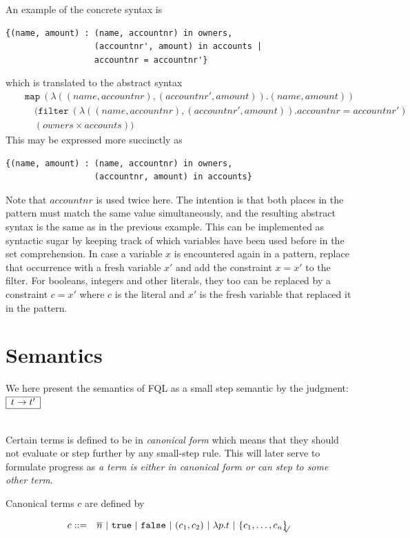 \documentclass[a4paper]{article}
\newcommand{\buzz}[1]{{\sl #1}}
\newcommand{\pipe}{\ | \ }
\newcommand{\s}[1]{\mathtt{#1}}
\newcommand{\sn}{\overline{n}}
\newcommand{\sLb}{\s{\{}}
\newcommand{\sRb}{\s{\}}}
\newcommand{\strue}{\s{true}}
\newcommand{\sfalse}{\s{false}}
\newcommand{\sset}[1]{\sLb #1 \sRb}
\newcommand{\ssetc}[1]{\sset{#1}_{\!\!\!\surd}}
\newcommand{\step}{\to}
\newcommand{\smbox}[1]{
  $\begin{array}{|c|}
    \hline
    #1 \\
    \hline
  \end{array}$
}
\begin{document}
An example of the concrete syntax is
\begin{verbatim}
{(name, amount) : (name, accountnr) in owners,
                  (accountnr', amount) in accounts |
                  accountnr = accountnr'}
\end{verbatim}
which is translated to the abstract syntax
\begin{eqnarray*}
&&\s{map\ } (\lambda ((name, accountnr), (accountnr', amount)). (name, amount))\\
&&\quad(\s{filter\ } (\lambda ((name, accountnr), (accountnr', amount)). accountnr = accountnr')\\
&&\quad(owners \times accounts))
\end{eqnarray*}
This may be expressed more succinctly as
\begin{verbatim}
{(name, amount) : (name, accountnr) in owners,
                  (accountnr, amount) in accounts}
\end{verbatim}
Note that $accountnr$ is used twice here. The intention is that
both places in the pattern must match the same value
simultaneously, and the resulting abstract syntax is the same as
in the previous example. This can be implemented as syntactic sugar
by keeping track of which variables have been used before in the
set comprehension. In case a variable $x$ is encountered again in a
pattern, replace that occurrence with a fresh variable $x'$ and add
the constraint $x = x'$ to
the filter. For booleans, integers and other literals, they too can
be replaced by a constraint $c = x'$ where $c$ is the literal and
$x'$ is the fresh variable that replaced it in the pattern.



\section{Semantics}
\label{sec:semantics}

We here present the semantics of FQL as a small step semantic by the judgment: \smbox{t \step t'}
\\

Certain terms is defined to be in \buzz{canonical form} which means
that they should not evaluate or step further by any small-step
rule. This will later serve to formulate progress as \buzz{ a term is
  either in canonical form or can step to some other term}.

Canonical terms $c$ are defined by

\begin{eqnarray*}
c & ::= & \sn \pipe \strue \pipe \sfalse \pipe (c_1, c_2) \pipe \lambda
p.t \pipe \ssetc{c_1,\ldots,c_n}
\end{eqnarray*}
\end{document}
